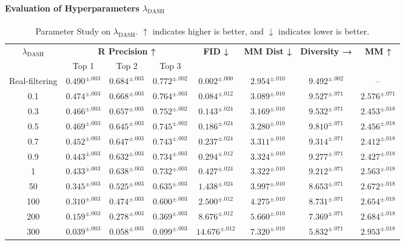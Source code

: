 \documentclass[a4paper,12pt]{article}
\begin{document}
\paragraph{Evaluation of Hyperparameters $\lambda_{\text{DASH}}$}

\begin{table}[t]
\centering
\scriptsize
\renewcommand{\arraystretch}{1}
\begin{tabular}{c|ccc|c|c|c|c}
\toprule
\multirow{2}{*}{\textbf{$\lambda_{\text{DASH}}$}} & \multicolumn{3}{c|}{\textbf{R Precision ↑}} & \multirow{2}{*}{\textbf{FID ↓}} & \multirow{2}{*}{\textbf{MM Dist ↓}} & \multirow{2}{*}{\textbf{Diversity →}} & \multirow{2}{*}{\textbf{MM ↑}} \\
 & Top 1 & Top 2 & Top 3 &  &  &  & \\
\midrule
Real-filtering    & $0.490^{\pm.003}$ & $0.684^{\pm.003}$ & $0.772^{\pm.002}$ & $0.002^{\pm.000}$ & $2.954^{\pm.010}$ & $9.492^{\pm.002}$ & -- \\ \midrule
0.1        & $0.474^{\pm.003}$ & $0.668^{\pm.003}$ & $0.764^{\pm.003}$ & $0.084^{\pm.012}$ & $3.089^{\pm.010}$ & $9.527^{\pm.071}$ & $2.576^{\pm.071}$ \\
0.3       & $0.466^{\pm.003}$ & $0.657^{\pm.003}$ & $0.752^{\pm.002}$ & $0.143^{\pm.024}$ & $3.169^{\pm.010}$ & $9.532^{\pm.071}$ & $2.453^{\pm.018}$ \\
0.5    & $0.469^{\pm.003}$ & $0.645^{\pm.003}$ & $0.745^{\pm.002}$ & $0.186^{\pm.024}$ & $3.280^{\pm.010}$ & $9.810^{\pm.071}$ &$2.456^{\pm.018}$ \\ 
0.7    & $0.452^{\pm.003}$ & $0.647^{\pm.003}$ & $0.743^{\pm.002}$ & $0.237^{\pm.024}$ & $3.311^{\pm.010}$ & $9.314^{\pm.071}$ & $2.412^{\pm.018}$ \\ 
0.9            & $0.443^{\pm.003}$ & $0.632^{\pm.003}$ & $0.734^{\pm.003}$ & $0.294^{\pm.012}$ & $3.324^{\pm.010}$ & $9.277^{\pm.071}$ & $2.427^{\pm.018}$ \\
1    & $0.433^{\pm.003}$ & $0.638^{\pm.003}$ & $0.732^{\pm.003}$ & $0.427^{\pm.024}$ & $3.322^{\pm.010}$ & $9.212^{\pm.071}$ & $2.563^{\pm.018}$ \\
50    & $0.345^{\pm.003}$ & $0.525^{\pm.003}$ & $0.635^{\pm.003}$ & $1.438^{\pm.024}$ & $3.997^{\pm.010}$ & $8.653^{\pm.071}$ & $2.672^{\pm.018}$ \\
100   & $0.310^{\pm.003}$ & $0.474^{\pm.003}$ & $0.600^{\pm.003}$ & $2.500^{\pm.012}$ & $4.275^{\pm.010}$ & $8.731^{\pm.071}$ & $2.654^{\pm.018}$ \\
200   & $0.159^{\pm.003}$ & $0.278^{\pm.003}$ & $0.369^{\pm.003}$ & $8.676^{\pm.012}$ & $5.660^{\pm.010}$ & $7.369^{\pm.071}$ & $2.684^{\pm.018}$ \\
300   & $0.039^{\pm.003}$ & $0.058^{\pm.003}$ & $0.099^{\pm.003}$ & $14.676^{\pm.012}$ & $7.320^{\pm.010}$ & $5.832^{\pm.071}$ & $2.953^{\pm.018}$ \\
\bottomrule
\end{tabular}
\caption{Parameter Study on $\lambda_{\text{DASH}}$. $\uparrow$ indicates higher is better, and $\downarrow$ indicates lower is better.}
\label{tab:Hyperparameters_1}
\end{table}
\end{document}
